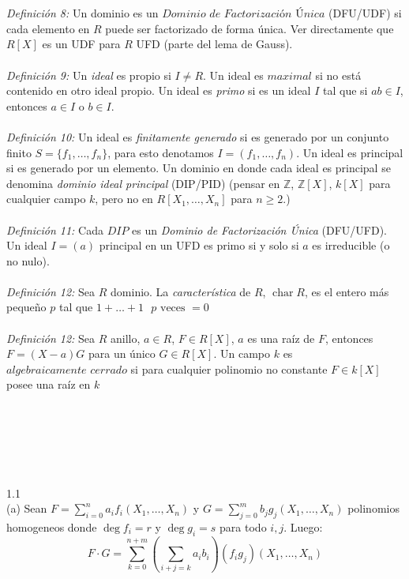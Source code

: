 \documentclass{article}
\newcommand{\Z}{\mathbb{Z}}
\begin{document}
\\
\\
\textit{Definición 8:} Un dominio es un $\textit{Dominio de Factorización Única}$ (DFU/UDF) si cada elemento en $R$ puede ser factorizado de forma única. Ver directamente que $R[X]$ es un UDF para $R$ UFD (parte del lema de Gauss).
\\
\\
\textit{Definición 9:} Un \textit{ideal} es propio si $I \neq R$. Un ideal es $\textit{maximal}$ si no está contenido en otro ideal propio. Un ideal es \textit{primo} si es un ideal $I$ tal que si $ab \in I$, entonces $a \in I$ o $b \in I$. 
\\
\\
\textit{Definición 10:} Un ideal es \textit{finitamente generado} si es generado por un conjunto finito $S= \{f_1, \dots, f_n \}$, para esto denotamos $I=(f_1 , \dots, f_n)$. Un ideal es principal si es generado por un elemento. Un dominio en donde cada ideal es principal se denomina \textit{dominio ideal principal} (DIP/PID) (pensar en $\Z$, $\Z[X]$, $k[X]$ para cualquier campo $k$, pero no en $R[X_1, \dots, X_n]$ para $n \geq 2$.)
\\
\\
\textit{Definición 11:} Cada $DIP$ es un \textit{Dominio de Factorización Única} (DFU/UFD). Un ideal $I=(a)$ principal en un UFD es primo si y solo si $a$ es irreducible (o no nulo).
\\
\\
\textit{Definición 12:} Sea $R$ dominio. La \textit{característica} de $R$, $\operatorname{char}{R}$, es el entero más pequeño $p$ tal que $1+\dots+1 \text{ $p$ veces } = 0$
\\
\\
\textit{Definición 12:} Sea $R$ anillo, $a \in R$, $F \in R[X]$, $a$ es una raíz de $F$, entonces $F=(X-a)G$ para un único $G \in R[X]$. Un campo $k$ es $\textit{algebraicamente cerrado}$ si para cualquier polinomio no constante $F \in k[X]$ posee una raíz en $k$
\\
\\
\\
\\
\\
\\
\\
1.1
\\
(a) Sean $F=\sum_{i=0}^{n}a_i f_i(X_1,\dots,X_n)$ y $G=\sum_{j=0}^{m} b_j g_j(X_1, \dots, X_n)$ polinomios homogeneos donde $\deg{f_i}=r$ y $\deg{g_i}=s$ para todo $i,j$. Luego:
\begin{equation*}
    F \cdot G = \sum_{k=0}^{n+m} \left( \sum_{i+j=k}a_i b_i\right) (f_i g_j)(X_1, \dots, X_n)
\end{equation*}
\end{document}
